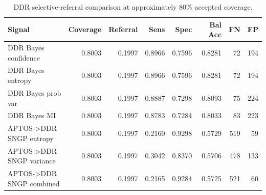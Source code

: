 \begin{table}[t]
\centering
\footnotesize
\caption{DDR selective-referral comparison at approximately 80\% accepted coverage.}
\label{tab:ddr-selective}
\begin{tabularx}{\textwidth}{X r r r r r r r}
\toprule
Signal & Coverage & Referral & Sens & Spec & Bal Acc & FN & FP \\
\midrule
DDR Bayes confidence & 0.8003 & 0.1997 & 0.8966 & 0.7596 & 0.8281 & 72 & 194 \\
DDR Bayes entropy & 0.8003 & 0.1997 & 0.8966 & 0.7596 & 0.8281 & 72 & 194 \\
DDR Bayes prob var & 0.8003 & 0.1997 & 0.8887 & 0.7298 & 0.8093 & 75 & 224 \\
DDR Bayes MI & 0.8003 & 0.1997 & 0.8783 & 0.7284 & 0.8033 & 83 & 223 \\
APTOS->DDR SNGP entropy & 0.8003 & 0.1997 & 0.2160 & 0.9298 & 0.5729 & 519 & 59 \\
APTOS->DDR SNGP variance & 0.8003 & 0.1997 & 0.3042 & 0.8370 & 0.5706 & 478 & 133 \\
APTOS->DDR SNGP combined & 0.8003 & 0.1997 & 0.2165 & 0.9284 & 0.5725 & 521 & 60 \\
\bottomrule
\end{tabularx}
\end{table}
